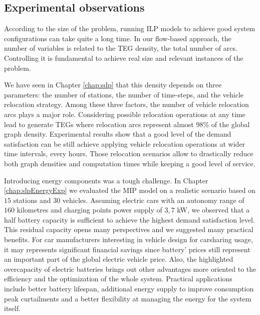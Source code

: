 
\subsection{Experimental observations}

According to the size of the problem, running ILP models to achieve good system configurations can take quite a long time.
In our flow-based approach, the number of variables is related to the TEG density, \ie the total number of arcs.
Controlling it is fundamental to achieve real size and relevant instances of the problem.

\medskip
We have seen in Chapter \ref{chap:sdp} that this density depends on three parameters: the number of stations, the number of time-steps, and the vehicle relocation strategy.
Among these three factors, the number of vehicle relocation arcs plays a major role.
Considering possible relocation operations at any time lead to generate TEGs where relocation arcs represent almost $98$\% of the global graph density.
Experimental results show that a good level of the demand satisfaction can be still achieve applying vehicle relocation operations at wider time intervals, \eg every hours.
Those relocation scenarios allow to drastically reduce both graph densities and computation times while keeping a good level of service.

\medskip
Introducing energy components was a tough challenge.
In Chapter \ref{chap:slpEnergyExp} we evaluated the {\ENERGY} MIP model on a realistic scenario based on $15$ stations and $30$ vehicles.
Assuming electric cars with an autonomy range of $160$ kilometres and charging points power supply of $3,7$ kW, we observed that a half battery capacity is sufficient to achieve the highest demand satisfaction level.
This residual capacity opens many perspectives and we suggested many practical benefits.
For car manufacturers interesting in vehicle design for carsharing usage, it may represents significant financial savings since battery' prices still represent an important part of the global electric vehicle price.
Also, the highlighted overcapacity of electric batteries brings out other advantages more oriented to the efficiency and the optimization of the whole system.
Practical applications include better battery lifespan, additional energy supply to improve consumption peak curtailments and a better flexibility at managing the energy for the system itself.


